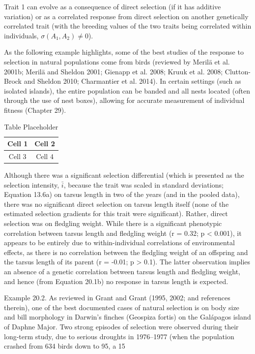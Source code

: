 \documentclass{article}
\begin{document}
Trait 1 can evolve as a consequence of direct selection (if it has additive variation) or as a correlated response from direct selection on another genetically correlated trait (with the breeding values of the two traits being correlated within individuals,  $ \sigma(A_1, A_2) \neq 0 $).

As the following example highlights, some of the best studies of the response to selection in natural populations come from birds (reviewed by Merilä et al. 2001b; Merilä and Sheldon 2001; Gienapp et al. 2008; Kruuk et al. 2008; Clutton-Brock and Sheldon 2010; Charmantier et al. 2014). In certain settings (such as isolated islands), the entire population can be banded and all nests located (often through the use of nest boxes), allowing for accurate measurement of individual fitness (Chapter 29).

\begin{table}[h]
\centering
\begin{tabular}{|c|c|}
\hline
Cell 1 & Cell 2 \\
\hline
Cell 3 & Cell 4 \\
\hline
\end{tabular}
\caption{Table Placeholder}
\end{table}

Although there was a significant selection differential (which is presented as the selection intensity,  $ \bar{i} $, because the trait was scaled in standard deviations; Equation 13.6a) on tarsus length in two of the years (and in the pooled data), there was no significant direct selection on tarsus length itself (none of the estimated selection gradients for this trait were significant). Rather, direct selection was on fledgling weight. While there is a significant phenotypic correlation between tarsus length and fledgling weight (r = 0.32; p < 0.001), it appears to be entirely due to within-individual correlations of environmental effects, as there is no correlation between the fledgling weight of an offspring and the tarsus length of its parent (r = -0.01; p > 0.1). The latter observation implies an absence of a genetic correlation between tarsus length and fledgling weight, and hence (from Equation 20.1b) no response in tarsus length is expected.

Example 20.2. As reviewed in Grant and Grant (1995, 2002; and references therein), one of the best documented cases of natural selection is on body size and bill morphology in Darwin's finches (Geospiza fortis) on the Galápagos island of Daphne Major. Two strong episodes of selection were observed during their long-term study, due to serious droughts in 1976–1977 (when the population crashed from 634 birds down to 95, a 15%
\end{document}
